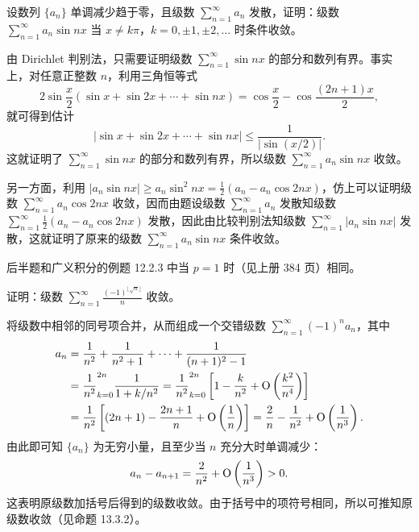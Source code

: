 \begin{xexample}[13.3.3]
设数列 $\{a_n\}$ 单调减少趋于零，且级数 $\sum_{n=1}^{\infty}a_n$ 发散，证明：级数 $\sum_{n=1}^{\infty}a_n\sin nx$ 当 $x\neq k\pi$，$k=0,\pm1,\pm2,\ldots$ 时条件收敛。
\end{xexample}
\begin{xproof}
由 Dirichlet 判别法，只需要证明级数 $\sum_{n=1}^{\infty}\sin nx$ 的部分和数列有界。事实上，对任意正整数 $n$，利用三角恒等式
\[
2\sin\frac x2(\sin x+\sin2x+\cdots+\sin nx)=\cos\frac x2-\cos\frac{(2n+1)x}{2},
\]
就可得到估计
\[
|\sin x+\sin2x+\cdots+\sin nx|\leq\frac1{|\sin(x/2)|}.
\]
这就证明了 $\sum_{n=1}^{\infty}\sin nx$ 的部分和数列有界，所以级数 $\sum_{n=1}^{\infty}a_n\sin nx$ 收敛。

另一方面，利用 $|a_n\sin nx|\geq a_n\sin^2nx=\frac12(a_n-a_n\cos2nx)$，仿上可以证明级数 $\sum_{n=1}^{\infty}a_n\cos2nx$ 收敛，因而由题设级数 $\sum_{n=1}^{\infty}a_n$ 发散知级数 $\sum_{n=1}^{\infty}\frac12(a_n-a_n\cos2nx)$ 发散，因此由比较判别法知级数 $\sum_{n=1}^{\infty}|a_n\sin nx|$ 发散，这就证明了原来的级数 $\sum_{n=1}^{\infty}a_n\sin nx$ 条件收敛。
\end{xproof}

\begin{xremark}
后半题和广义积分的例题 12.2.3 中当 $p=1$ 时（见上册 384 页）相同。
\end{xremark}

\begin{xexample}[13.3.4]
证明：级数 $\sum_{n=1}^{\infty}\frac{(-1)^{\lfloor\sqrt n\rfloor}}n$ 收敛。
\end{xexample}
\begin{xsolution}
将级数中相邻的同号项合并，从而组成一个交错级数 $\sum_{n=1}^{\infty}(-1)^na_n$，其中
\[
\begin{aligned}
a_n&=\frac1{n^2}+\frac1{n^2+1}+\cdots+\frac1{(n+1)^2-1}\\
&=\frac1{n^2}\relax_{k=0}^{2n}\frac1{1+k/n^2}
=\frac1{n^2}\relax_{k=0}^{2n}\left[1-\frac{k}{n^2}+\mathrm{O}\left(\frac{k^2}{n^4}\right)\right]\\
&=\frac1{n^2}\left[(2n+1)-\frac{2n+1}{n}+\mathrm{O}\left(\frac1n\right)\right]
=\frac2n-\frac1{n^2}+\mathrm{O}\left(\frac1{n^3}\right).
\end{aligned}
\]
由此即可知 $\{a_n\}$ 为无穷小量，且至少当 $n$ 充分大时单调减少：
\[
a_n-a_{n+1}=\frac2{n^2}+\mathrm{O}\left(\frac1{n^3}\right)>0.
\]
这表明原级数加括号后得到的级数收敛。由于括号中的项符号相同，所以可推知原级数收敛（见命题 13.3.2）。
\end{xsolution}

